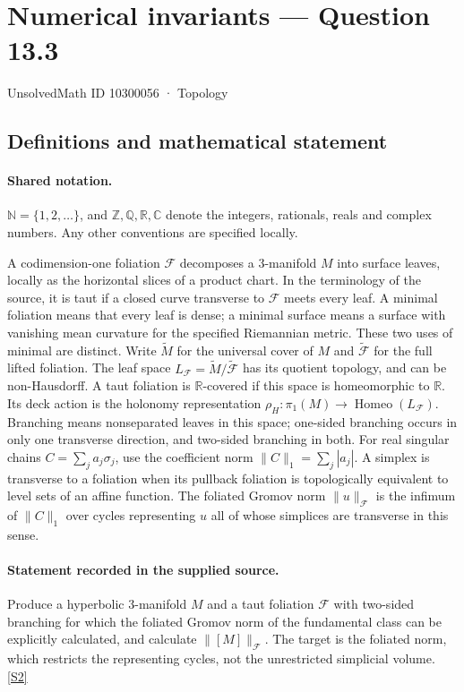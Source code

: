 \documentclass[11pt]{article}
\newcommand{\sref}[2]{\hyperlink{source:#1:#2}{[S#2]}}
\begin{document}
\setcounter{section}{10300055}
\section{Numerical invariants — Question 13.3}\label{10300056}
{\small\sffamily UnsolvedMath ID 10300056 · Topology}
\subsection{Definitions and mathematical statement}

\paragraph{Shared notation.}$\mathbb N=\{1,2,\ldots\}$, and $\mathbb Z,\mathbb Q,\mathbb R,\mathbb C$ denote the integers, rationals, reals and complex numbers. Any other conventions are specified locally.


A codimension-one foliation $\mathcal F$ decomposes a $3$-manifold $M$ into surface leaves, locally as the horizontal slices of a product chart. In the terminology of the source, it is taut if a closed curve transverse to $\mathcal F$ meets every leaf. A minimal foliation means that every leaf is dense; a minimal surface means a surface with vanishing mean curvature for the specified Riemannian metric. These two uses of minimal are distinct. Write $\widetilde M$ for the universal cover of $M$ and $\widetilde{\mathcal F}$ for the full lifted foliation. The leaf space $L_{\mathcal F}=\widetilde M/\widetilde{\mathcal F}$ has its quotient topology, and can be non-Hausdorff. A taut foliation is $\mathbb R$-covered if this space is homeomorphic to $\mathbb R$. Its deck action is the holonomy representation $\rho_H:\pi_1(M)\longrightarrow\operatorname{Homeo}(L_{\mathcal F})$. Branching means nonseparated leaves in this space; one-sided branching occurs in only one transverse direction, and two-sided branching in both. For real singular chains $C=\sum_j a_j\sigma_j$, use the coefficient norm $\|C\|_1=\sum_j|a_j|$. A simplex is transverse to a foliation when its pullback foliation is topologically equivalent to level sets of an affine function. The foliated Gromov norm $\|u\|_{\mathcal F}$ is the infimum of $\|C\|_1$ over cycles representing $u$ all of whose simplices are transverse in this sense.
\paragraph{Statement recorded in the supplied source.}
Produce a hyperbolic $3$-manifold $M$ and a taut foliation $\mathcal F$ with two-sided branching for which the foliated Gromov norm of the fundamental class can be explicitly calculated, and calculate $\|[M]\|_{\mathcal F}$. The target is the foliated norm, which restricts the representing cycles, not the unrestricted simplicial volume. \sref{10300056}{2}
\end{document}

